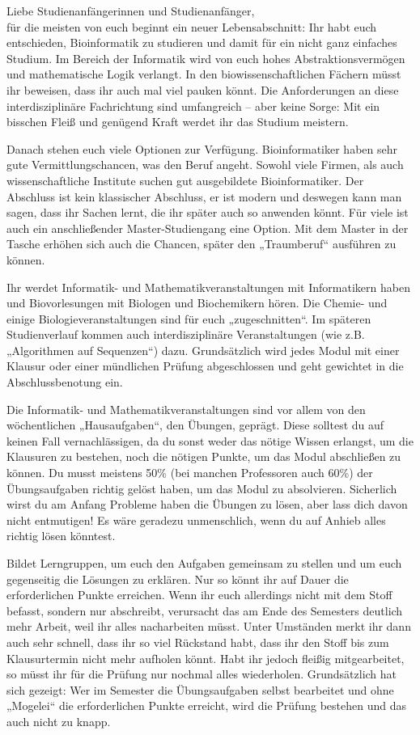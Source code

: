 Liebe Studienanfängerinnen und Studienanfänger,\\
für die meisten von euch beginnt ein neuer Lebensabschnitt:
Ihr habt euch entschieden, Bioinformatik zu studieren und damit für ein nicht ganz einfaches Studium.
Im Bereich der Informatik wird von euch hohes Abstraktionsvermögen und mathematische Logik verlangt.
In den biowissenschaftlichen Fächern müsst ihr beweisen, dass ihr auch mal viel pauken könnt.
Die Anforderungen an diese interdisziplinäre Fachrichtung sind umfangreich – aber keine Sorge:
Mit ein bisschen Fleiß und genügend Kraft werdet ihr das Studium meistern.

Danach stehen euch viele Optionen zur Verfügung.
Bioinformatiker haben sehr gute Vermittlungschancen, was den Beruf angeht.
Sowohl viele Firmen, als auch wissenschaftliche Institute suchen gut ausgebildete Bioinformatiker.
Der Abschluss ist kein klassischer Abschluss, er ist modern und deswegen kann man sagen, dass ihr Sachen lernt, die ihr später auch so anwenden könnt.
Für viele ist auch ein anschließender Master-Studiengang eine Option.
Mit dem Master in der Tasche erhöhen sich auch die Chancen, später den „Traumberuf“ ausführen zu können.

Ihr werdet Informatik- und Mathematikveranstaltungen mit Informatikern haben und Biovorlesungen mit Biologen und Biochemikern hören.
Die Chemie- und einige Biologieveranstaltungen sind für euch „zugeschnitten“.
Im späteren Studienverlauf kommen auch interdisziplinäre Veranstaltungen (wie z.B. „Algorithmen auf Sequenzen“) dazu.
Grundsätzlich wird jedes Modul mit einer Klausur oder einer mündlichen Prüfung abgeschlossen und geht gewichtet in die Abschlussbenotung ein.

Die Informatik- und Mathematikveranstaltungen sind vor allem von den wöchent\-lichen „Hausaufgaben“, den Übungen, geprägt.
Diese solltest du auf keinen Fall vernachlässigen, da du sonst weder das nötige Wissen erlangst, um die Klausuren zu bestehen, noch die nötigen Punkte, um das Modul abschließen zu können.
Du musst meistens 50\% (bei manchen Professoren auch 60\%) der Übungsaufgaben richtig gelöst haben, um das Modul zu absolvieren.
Sicherlich wirst du am Anfang Probleme haben die Übungen zu lösen, aber lass dich davon nicht entmutigen!
Es wäre geradezu unmenschlich, wenn du auf Anhieb alles richtig lösen könntest.

Bildet Lerngruppen, um euch den Aufgaben gemeinsam zu stellen und um euch gegenseitig die Lösungen zu erklären.
Nur so könnt ihr auf Dauer die erforderlichen Punkte erreichen.
Wenn ihr euch allerdings nicht mit dem Stoff befasst, sondern nur abschreibt, verursacht das am Ende des Semesters deutlich mehr Arbeit, weil ihr alles nacharbeiten müsst.
Unter Umständen merkt ihr dann auch sehr schnell, dass ihr so viel Rückstand habt, dass ihr den Stoff bis zum Klausurtermin nicht mehr aufholen könnt. Habt ihr jedoch fleißig mitgearbeitet, so müsst ihr für die Prüfung nur nochmal alles wiederholen.
Grundsätzlich hat sich gezeigt:
Wer im Semester die Übungsaufgaben selbst bearbeitet und ohne „Mogelei“ die erforderlichen Punkte erreicht, wird die Prüfung bestehen und das auch nicht zu knapp.

